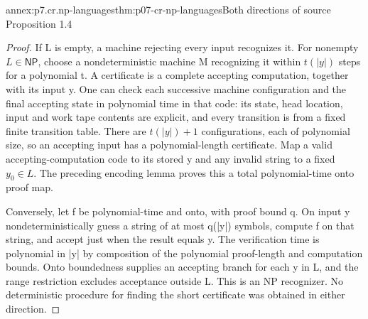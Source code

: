 \begin{annexitem}{annex:p7.cr.np-languages}{thm:p07-cr-np-languages}{Both directions of source Proposition 1.4}
\begin{proof}
If L is empty, a machine rejecting every input recognizes it.
For nonempty \(L\in\mathsf{NP}\), choose a nondeterministic
machine M recognizing it within \(t(|y|)\) steps for a polynomial t.
A certificate is a complete accepting computation, together with
its input y. One can check each successive machine configuration
and the final accepting state in polynomial time in that code:
its state, head location, input and work tape contents are explicit,
and every transition is from a fixed finite transition table.
There are \(t(|y|)+1\) configurations, each of polynomial size,
so an accepting input has a polynomial-length certificate.
Map a valid accepting-computation code to its stored y and any
invalid string to a fixed \(y_0\in L\). The preceding encoding
lemma proves this a total polynomial-time onto proof map.

Conversely, let f be polynomial-time and onto, with proof bound q.
On input y nondeterministically guess a string of at most q(|y|)
symbols, compute f on that string, and accept just when the result
equals y. The verification time is polynomial in |y| by composition
of the polynomial proof-length and computation bounds. Onto
boundedness supplies an accepting branch for each y in L, and
the range restriction excludes acceptance outside L. This is an
NP recognizer. No deterministic procedure for finding the short
certificate was obtained in either direction.
\end{proof}
\end{annexitem}

